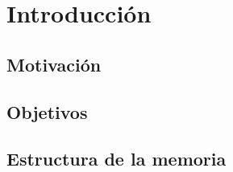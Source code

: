 \chapter{Introducción}
\section{Motivación}
\section{Objetivos}
\section{Estructura de la memoria}

